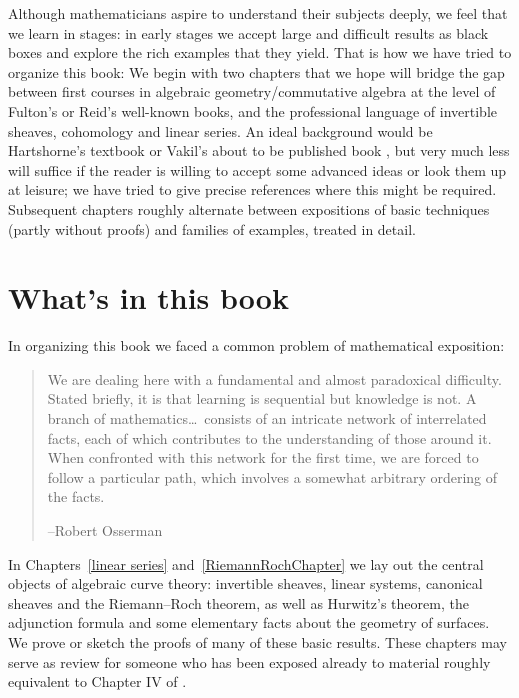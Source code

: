 Although mathematicians aspire to understand their subjects deeply, we feel that we learn in stages: in early stages we accept large and difficult results as black boxes and explore the rich examples that they yield. That is how we have tried to organize this book: 
We begin with two chapters that we hope will bridge the gap between
first courses in algebraic geometry/commutative algebra at the level
of Fulton's \citeyear{Fulton1989} or Reid's \citeyear{MR982494}
well-known books, and the professional language of invertible sheaves,
cohomology and linear series. An ideal background would 
be Hartshorne's textbook \citeyear{Hartshorne1977} or Vakil's 
about to be published book
\citeyear{Vakil-notes}, but very much less will suffice if the reader is
willing to accept some advanced ideas or look them up at leisure; we
have tried to give precise references where this might be required.
Subsequent chapters roughly alternate between expositions of basic
techniques (partly without proofs) and families of examples, treated
in detail.  

\section*{What's in this book}
In organizing this book we faced a common problem of  mathematical exposition:
\begin{quote}
\small\sf
We are dealing here with a fundamental and almost paradoxical difficulty. Stated briefly, it is that learning is sequential but knowledge is not. A branch of mathematics\dots\ consists of an intricate network of interrelated facts, each of which contributes to the understanding of those around it. When confronted with this network for the first time, we are forced to follow a particular path, which involves a somewhat arbitrary ordering of the facts.

--Robert 
Osserman
\citeyear{Poetry}
%
\end{quote}

In Chapters~\ref{linear series} and~\ref{RiemannRochChapter} we lay out the central objects of algebraic curve theory: invertible sheaves, linear systems, canonical sheaves and the Riemann--Roch theorem, as well as
Hurwitz's theorem,
the adjunction formula and  some elementary facts about the geometry of surfaces. We prove or sketch the
proofs of many of these basic results. These chapters may serve as review for someone who has been exposed already to material roughly equivalent to Chapter IV of \cite{Hartshorne1977}. 

